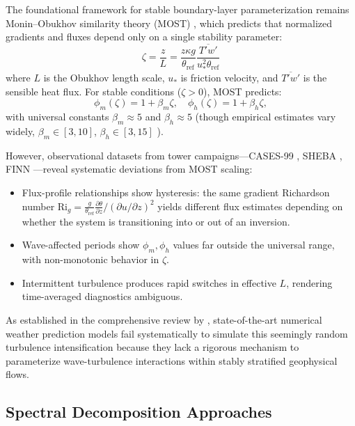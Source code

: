 \documentclass[11pt,a4paper]{article}
\begin{document}
The foundational framework for stable boundary-layer parameterization remains Monin--Obukhov similarity theory (MOST) \citep{Obukhov1946, Paulson1970}, which predicts that normalized gradients and fluxes depend only on a single stability parameter:
\begin{equation}
\zeta = \frac{z}{L} = \frac{z \kappa g}{\theta_{\mathrm{ref}}} \frac{\overline{T'w'}}{u_*^2 \theta_{\mathrm{ref}}}
\label{eq:zeta}
\end{equation}
where $L$ is the Obukhov length scale, $u_*$ is friction velocity, and $\overline{T'w'}$ is the sensible heat flux. For stable conditions ($\zeta > 0$), MOST predicts:
\begin{equation}
\phi_m(\zeta) = 1 + \beta_m\zeta, \quad \phi_h(\zeta) = 1 + \beta_h\zeta,
\end{equation}
with universal constants $\beta_m \approx 5$ and $\beta_h \approx 5$ (though empirical estimates vary widely, $\beta_m \in [3, 10]$, $\beta_h \in [3, 15]$ \citep{Dyer1974, Högström1988}).

However, observational datasets from tower campaigns---CASES-99 \citep{Poulos2002}, SHEBA \citep{Uttal2002}, FINN \citep{Mahrt2013}---reveal systematic deviations from MOST scaling:
\begin{itemize}
  \item Flux-profile relationships show hysteresis: the same gradient Richardson number $\mathrm{Ri}_g = \frac{g}{\theta_{\mathrm{ref}}} \frac{\partial \theta}{\partial z} / (\partial u / \partial z)^2$ yields different flux estimates depending on whether the system is transitioning into or out of an inversion.
  \item Wave-affected periods show $\phi_m, \phi_h$ values far outside the universal range, with non-monotonic behavior in $\zeta$.
  \item Intermittent turbulence produces rapid switches in effective $L$, rendering time-averaged diagnostics ambiguous.
\end{itemize}

As established in the comprehensive review by \citet{Sun2015}, state-of-the-art numerical weather prediction models fail systematically to simulate this seemingly random turbulence intensification because they lack a rigorous mechanism to parameterize wave-turbulence interactions within stably stratified geophysical flows.

\subsection{Spectral Decomposition Approaches}
\end{document}
